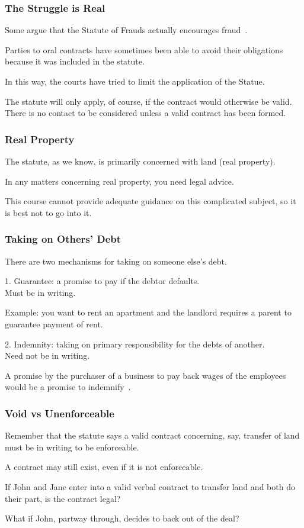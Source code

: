 \begin{frame}
\frametitle{The Struggle is Real}

Some argue that the Statute of Frauds actually encourages fraud~\cite{lba}.

Parties to oral contracts have sometimes been able to avoid their obligations because it was included in the statute.

In this way, the courts have tried to limit the application of the Statue.


The statute will only apply, of course, if the contract would otherwise be valid.\\
\quad There is no contact to be considered unless a valid contract has been formed.

\end{frame}



\begin{frame}
\frametitle{Real Property}

The statute, as we know, is primarily concerned with land (real property).

In any matters concerning real property, you need legal advice.

This course cannot provide adequate guidance on this complicated subject, so it is best not to go into it.

\end{frame}



\begin{frame}
\frametitle{Taking on Others' Debt}

There are two mechanisms for taking on someone else's debt.

1. \alert{Guarantee}: a promise to pay if the debtor defaults.\\
\quad Must be in writing.

Example: you want to rent an apartment and the landlord requires a parent to guarantee payment of rent.

2. \alert{Indemnity}: taking on primary responsibility for the debts of another.\\
\quad Need not be in writing.

A promise by the purchaser of a business to pay back wages of the employees would be a promise to indemnify~\cite{lba}.

\end{frame}



\begin{frame}
\frametitle{Void vs Unenforceable}

Remember that the statute says a valid contract concerning, say, transfer of land must be in writing to be enforceable.

A contract may still exist, even if it is not enforceable.

If John and Jane enter into a valid verbal contract to transfer land and both do their part, is the contract legal?

What if John, partway through, decides to back out of the deal?

\end{frame}



